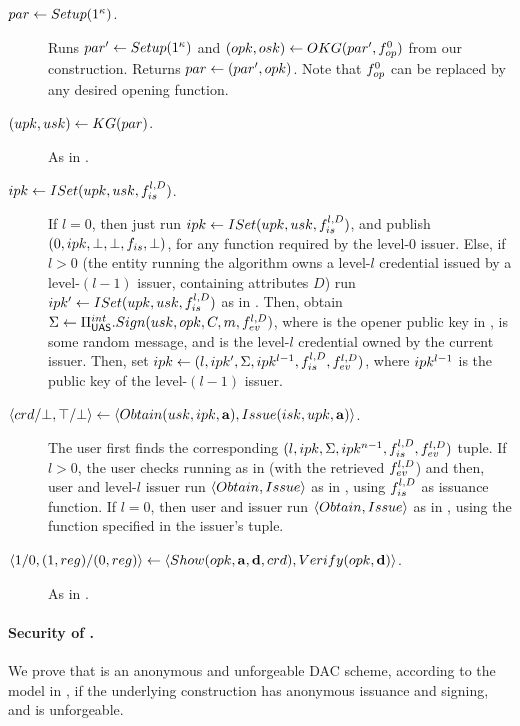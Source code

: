 \begin{description}
\item[$par \gets Setup(1^\kappa)$.]  Runs $par' \gets Setup(1^\kappa)$
  and $(opk,osk) \gets OKG(par',f_{op}^0)$ from our
  \CUASGenInt construction. Returns $par \gets (par',opk)$. Note
  that $f_{op}^0$ can be replaced by any desired opening function.
\item[$(upk,usk) \gets KG(par)$.] As in \CUASGenInt.
\item[$ipk \gets ISet(upk,usk,f_{is}^{l,D})$.] If $l = 0$, then just
  run $ipk \gets ISet(upk,usk,f_{is}^{l,D})$, and publish $(0,ipk,\bot,
  \bot,f_{is},\bot)$, for any \fissue function required by the level-$0$
  issuer. Else,  
  if $l > 0$ (the entity running the algorithm owns a level-$l$ credential
  issued by a level-$(l-1)$ issuer, containing attributes $D$) run $ipk' \gets
  ISet(upk,usk,f_{is}^{l,D})$ as in \CUASGenInt. Then, obtain $\Sigma \gets
  \Pi_{\mathsf{UAS}}^{int}.Sign(usk,opk,C,m,f_{ev}^{l,D})$, where \opk is the
  opener public key in \parm, \msg is some random message, and \Cred is the
  level-$l$ credential owned by the current issuer. Then, set
  $ipk \gets (l,ipk',\Sigma,ipk^{l-1},f_{is}^{l,D},f_{ev}^{l,D})$, where
  $ipk^{l-1}$ is the public key of the level-$(l-1)$ issuer.
\item[$\langle crd/\bot,\top/\bot \rangle \gets
  \langle Obtain(usk,ipk,\mathbf{a}),Issue(isk,upk,\mathbf{a}) \rangle$.]
  The user first finds the corresponding $(l,ipk,\Sigma,ipk^{n-1},f_{is}^{l,D},
  f_{ev}^{l,D})$ tuple. If $l>0$, the user checks \Sig running \Verify as in
  \CUASGenInt (with the retrieved $f_{ev}^{l,D}$) and then, user and level-$l$
  issuer run $\langle Obtain,Issue\rangle$ as in \CUASGenInt, using
  $f_{is}^{l,D}$ as issuance function. If $l=0$, then user and issuer
  run $\langle Obtain,Issue\rangle$ as in \CUASGenInt, using the \fissue
  function specified in the issuer's tuple.
\item[$\langle 1/0,(1,reg)/(0,reg)\rangle
  \gets \langle Show(opk,\mathbf{a},\mathbf{d},crd),
  Verify(opk,\mathbf{d}) \rangle$.] As in \CUASGenInt.
\end{description}

\paragraph{Security of \CUASDAC.} %
We prove that \CUASDAC is an anonymous and unforgeable DAC scheme, according to
the model in , if the underlying \CUASGenInt construction
has anonymous issuance and signing, and is unforgeable.

